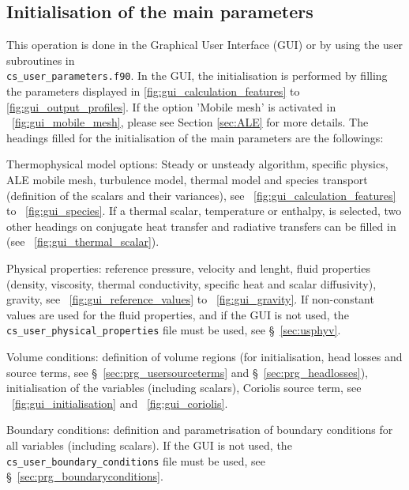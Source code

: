 {{%
\subsection{Initialisation of the main parameters}

This operation is done in the Graphical User Interface (GUI) or by using the user subroutines in \\ \texttt{cs\_user\_parameters.f90}.
In the GUI, the initialisation is performed by filling the parameters displayed in \figurename\ref{fig:gui_calculation_features}
to \ref{fig:gui_output_profiles}. If the option 'Mobile mesh' is activated in \figurename~\ref{fig:gui_mobile_mesh},
please see Section \ref{sec:ALE} for more details. The headings filled for the initialisation of the main parameters
are the followings:
\begin{list}{-}{}
\item Thermophysical model options: Steady or unsteady algorithm, specific physics, ALE mobile mesh,
      turbulence model, thermal model and species transport (definition of the scalars and their variances),
see \figurename~\ref{fig:gui_calculation_features} to \figurename~\ref{fig:gui_species}. If a thermal scalar, temperature or enthalpy, is selected,
two other headings on conjugate heat transfer and radiative transfers can be filled in (see \figurename~\ref{fig:gui_thermal_scalar}).
\item Physical properties: reference pressure, velocity and lenght, fluid properties (density, viscosity, thermal conductivity,
specific heat and scalar diffusivity), gravity, see \figurename~\ref{fig:gui_reference_values} to \figurename~\ref{fig:gui_gravity}.
If non-constant values are used for the fluid properties, and if the GUI is not used, the \\ \texttt{cs\_user\_physical\_properties}
file must be used, see \S~\ref{sec:usphyv}.
\item Volume conditions: definition of volume regions (for initialisation, head losses and source terms,
see \S~\ref{sec:prg_usersourceterms} and \S~\ref{sec:prg_headlosses}), initialisation of the variables (including scalars),
Coriolis source term, see \figurename~\ref{fig:gui_initialisation} and \figurename~\ref{fig:gui_coriolis}.
\item Boundary conditions: definition and parametrisation of boundary conditions for all variables (including scalars).
If the GUI is not used, the \texttt{cs\_user\_boundary\_conditions} file must be used, see \S~\ref{sec:prg_boundaryconditions}.

\end{list}}}
